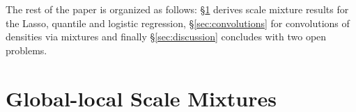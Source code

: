 \documentclass[lineno]{biometrika}
\begin{document}
%
%

The rest of the paper is organized as follows: \S\ref{sec:gls_mixes} derives scale mixture
results for the Lasso, quantile and logistic regression, \S\ref{sec:convolutions} for convolutions
of densities via mixtures and finally \S\ref{sec:discussion} concludes with two open problems. 

\section{Global-local Scale Mixtures}
\label{sec:gls_mixes}
\end{document}
